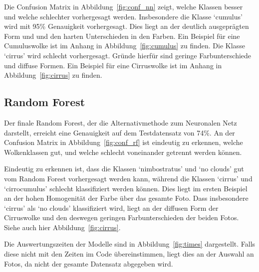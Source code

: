 Die Confusion Matrix in Abbildung~\ref{fig:conf_nn} zeigt, welche Klassen besser und
welche schlechter vorhergesagt werden.
Insbesondere die Klasse `cumulus' wird mit 95\% Genauigkeit vorhergesagt.
Dies liegt an der deutlich ausgeprägten Form und und den harten Unterschieden in den Farben.
Ein Beispiel für eine Cumuluswolke ist im Anhang in Abbildung~\ref{fig:cumulus} zu finden.
Die Klasse `cirrus' wird schlecht vorhergesagt.
Gründe hierfür sind geringe Farbunterschiede und diffuse Formen.
Ein Beispiel für eine Cirruswolke ist im Anhang in Abbildung~\ref{fig:cirrus} zu finden.


\hypertarget{random-forest-1}{%
\subsection{Random Forest}\label{random-forest-1}}

Der finale Random Forest, der die Alternativmethode zum Neuronalen Netz
darstellt, erreicht eine Genauigkeit auf dem Testdatensatz von 74\%.
An der Confusion Matrix in Abbildung~\ref{fig:conf_rf} ist eindeutig zu erkennen, welche
Wolkenklassen gut, und welche schlecht voneinander getrennt werden
können.

Eindeutig zu erkennen ist, dass die Klassen `nimbostratus' und `no clouds' gut
vom Random Forest vorhergesagt werden kann, während die Klassen
`cirrus' und `cirrocumulus' schlecht klassifiziert werden
können.
Dies liegt im ersten Beispiel an der hohen Homogenität der Farbe über das gesamte Foto.
Dass insbesondere `cirrus' als `no clouds' klassifiziert wird,
liegt an der diffusen Form der Cirruswolke und den deswegen geringen Farbunterschieden der beiden
Fotos.
Siehe auch hier Abbildung~\ref{fig:cirrus}.

Die Auswertungszeiten der Modelle sind in Abbildung~\ref{fig:times} dargestellt.
Falls diese nicht mit den Zeiten im Code übereinstimmen, liegt dies an der Auswahl an
Fotos, da nicht der gesamte Datensatz abgegeben wird.

